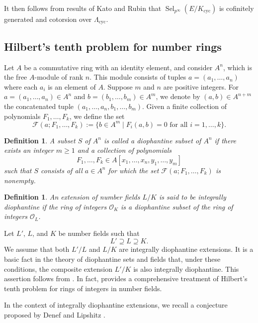 \documentclass[12pt]{amsart}
\newtheorem{definition}[theorem]{Definition}
\newcommand{\op}[1]{\operatorname{#1}}
\numberwithin{equation}{section}
\begin{document}
\par It then follows from results of Kato \cite{Katomodform} and Rubin \cite{RubinBSD} that $\op{Sel}_{p^\infty}(E/K_{\op{cyc}})$ is cofinitely generated and cotorsion over $\Lambda_{\op{cyc}}$. 

\subsection{Hilbert's tenth problem for number rings}\label{s 2.2}
Let $ A $ be a commutative ring with an identity element, and consider $ A^n $, which is the free $ A $-module of rank $ n $. This module consists of tuples $ a = (a_1, \dots, a_n) $ where each $ a_i $ is an element of $ A $. Suppose $ m $ and $ n $ are positive integers. For $ a = (a_1, \dots, a_n) \in A^n $ and $ b = (b_1, \dots, b_m) \in A^m $, we denote by $ (a,b) \in A^{n+m} $ the concatenated tuple $ (a_1, \dots, a_n, b_1, \dots, b_m) $. Given a finite collection of polynomials $ F_1, \dots, F_k $, we define the set 
\[
\mathcal{F}(a; F_1, \dots, F_k) := \{ b \in A^m \mid F_i(a,b) = 0 \text{ for all } i = 1, \dots, k \}.
\]

\begin{definition}\label{diophantine subset}
A subset $ S $ of $ A^n $ is called a \emph{diophantine subset} of $ A^n $ if there exists an integer $ m \geq 1 $ and a collection of polynomials \[F_1, \dots, F_k \in A[x_1, \dots, x_n, y_1, \dots, y_m] \] such that $ S $ consists of all $ a \in A^n $ for which the set $ \mathcal{F}(a; F_1, \dots, F_k) $ is nonempty.
\end{definition} 

\begin{definition}
An extension of number fields $ L/K $ is said to be \emph{integrally diophantine} if the ring of integers $ \mathcal{O}_K $ is a diophantine subset of the ring of integers $ \mathcal{O}_L $.
\end{definition} Let $ L' $, $ L $, and $ K $ be number fields such that 
\[ L' \supseteq L \supseteq K. \]
We assume that both $ L'/L $ and $ L/K $ are integrally diophantine extensions. It is a basic fact in the theory of diophantine sets and fields that, under these conditions, the composite extension $ L'/K $ is also integrally diophantine. This assertion follows from \cite[Theorem 2.1.15]{shlapentokh2007hilbert}. In fact, \cite{shlapentokh2007hilbert} provides a comprehensive treatment of Hilbert's tenth problem for rings of integers in number fields.


In the context of integrally diophantine extensions, we recall a conjecture proposed by Denef and Lipshitz \cite{denef1978diophantine}.
\end{document}
